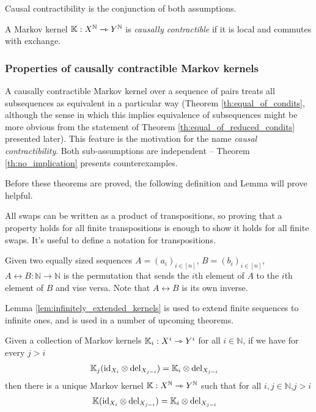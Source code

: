 Causal contractibility is the conjunction of both assumptions.
\begin{definition}
A Markov kernel $\mathbb{K}:X^{\mathbb{N}}\rightarrowtriangle Y^{\mathbb{N}}$ is \emph{causally contractible} if it is local and commutes with exchange.
\end{definition}

\subsubsection{Properties of causally contractible Markov kernels}

A causally contractible Markov kernel over a sequence of pairs treats all subsequences as equivalent in a particular way (Theorem \ref{th:equal_of_condits}, although the sense in which this implies equivalence of subsequences might be more obvious from the statement of Theorem \ref{th:equal_of_reduced_condits} presented later). This feature is the motivation for the name \emph{causal contractibility}. Both sub-assumptions are independent -- Theorem \ref{th:no_implication} presents counterexamples.

Before these theorems are proved, the following definition and Lemma will prove helpful.

All swaps can be written as a product of transpositions, so proving that a property holds for all finite transpositions is enough to show it holds for all finite swaps. It's useful to define a notation for transpositions.
\begin{definition}
Given two equally sized sequences $A=(a_i)_{i\in [n]}$, $B=(b_i)_{i\in [n]}$, ${A\leftrightarrow B}:\mathbb{N}\to \mathbb{N}$ is the permutation that sends the $i$th element of $A$ to the $i$th element of $B$ and vise versa. Note that $A\leftrightarrow B$ is its own inverse.
\end{definition}

Lemma \ref{lem:infinitely_extended_kernels} is used to extend finite sequences to infinite ones, and is used in a number of upcoming theorems.

\begin{lemma}\label{lem:infinitely_extended_kernels}
Given a collection of Markov kernels $\mathbb{K}_i:X^i\rightarrowtriangle Y^i$ for all $i\in \mathbb{N}$, if we have for every $j>i$
\begin{align}
    \mathbb{K}_j(\text{id}_{X_i}\otimes \text{del}_{X_{j-i}}) &= \mathbb{K}_i\otimes \text{del}_{X_{j-i}}\label{eq:marginalise_comb}
\end{align} 
then there is a unique Markov kernel $\mathbb{K}:X^{\mathbb{N}}\rightarrowtriangle Y^{\mathbb{N}}$ such that for all $i,j\in \mathbb{N}$,$j>i$
\begin{align}
    \mathbb{K}(\text{id}_{X_i}\otimes \text{del}_{X_{j-i}})&= \mathbb{K}_i\otimes \text{del}_{X_{j-i}}
\end{align}
\end{lemma}

